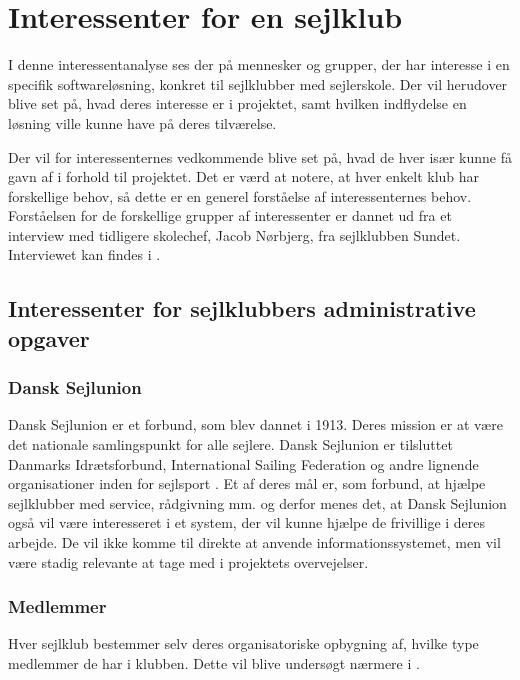 \chapter{Interessenter for en sejlklub}\label{chap:interessent-analyse-ved-sejlklubber}

I denne interessentanalyse ses der på mennesker og grupper, der har interesse i en specifik softwareløsning,
konkret til sejlklubber med sejlerskole. Der vil herudover blive set på, hvad deres interesse er i projektet,
samt hvilken indflydelse en løsning ville kunne have på deres tilværelse.

Der vil for interessenternes vedkommende blive set på, hvad de hver især kunne få gavn af i forhold til
projektet. Det er værd at notere, at hver enkelt klub har forskellige behov, så dette er en generel forståelse
af interessenternes behov. Forståelsen for de forskellige grupper af interessenter er dannet ud fra et
interview med tidligere skolechef, Jacob Nørbjerg, fra sejlklubben Sundet. Interviewet kan findes i .


\section{Interessenter for sejlklubbers administrative opgaver}


\subsection{Dansk Sejlunion}

Dansk Sejlunion er et forbund, som blev dannet i 1913. Deres mission er at være det nationale samlingspunkt for alle sejlere. 
Dansk Sejlunion er tilsluttet Danmarks Idrætsforbund, International Sailing Federation og andre lignende
organisationer inden for sejlsport \citep{Sejlsportdk}.
Et af deres mål er, som forbund, at hjælpe sejlklubber med service, rådgivning mm. og derfor menes det, at Dansk
Sejlunion også vil være interesseret i et system, der vil kunne hjælpe de frivillige i deres arbejde. 
De vil ikke komme til direkte at anvende informationssystemet, men vil være stadig relevante at tage med i projektets overvejelser.


\subsection{Medlemmer}

Hver sejlklub bestemmer selv deres organisatoriske opbygning af, hvilke type medlemmer de har i klubben.
Dette vil blive undersøgt nærmere i . 


